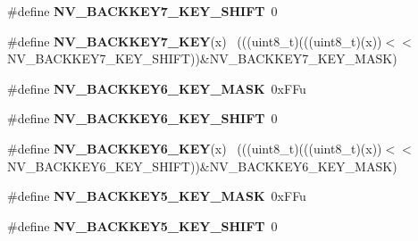 \begin{DoxyCompactItemize}
\item 
\hypertarget{group___n_v___register___masks_gad6bef74e61e792dfa5b7d195e4ce5620}{}\#define {\bfseries N\+V\+\_\+\+B\+A\+C\+K\+K\+E\+Y7\+\_\+\+K\+E\+Y\+\_\+\+S\+H\+I\+F\+T}~0\label{group___n_v___register___masks_gad6bef74e61e792dfa5b7d195e4ce5620}

\item 
\hypertarget{group___n_v___register___masks_gad81b2addd996d3f0ee299e252d88b0a9}{}\#define {\bfseries N\+V\+\_\+\+B\+A\+C\+K\+K\+E\+Y7\+\_\+\+K\+E\+Y}(x)                                          ~(((uint8\+\_\+t)(((uint8\+\_\+t)(x))$<$$<$N\+V\+\_\+\+B\+A\+C\+K\+K\+E\+Y7\+\_\+\+K\+E\+Y\+\_\+\+S\+H\+I\+F\+T))\&N\+V\+\_\+\+B\+A\+C\+K\+K\+E\+Y7\+\_\+\+K\+E\+Y\+\_\+\+M\+A\+S\+K)\label{group___n_v___register___masks_gad81b2addd996d3f0ee299e252d88b0a9}

\item 
\hypertarget{group___n_v___register___masks_ga44e2d846ef1b9d5ad94a707fa6f29ae1}{}\#define {\bfseries N\+V\+\_\+\+B\+A\+C\+K\+K\+E\+Y6\+\_\+\+K\+E\+Y\+\_\+\+M\+A\+S\+K}~0x\+F\+Fu\label{group___n_v___register___masks_ga44e2d846ef1b9d5ad94a707fa6f29ae1}

\item 
\hypertarget{group___n_v___register___masks_ga271a532af55987843f56d660efb5d440}{}\#define {\bfseries N\+V\+\_\+\+B\+A\+C\+K\+K\+E\+Y6\+\_\+\+K\+E\+Y\+\_\+\+S\+H\+I\+F\+T}~0\label{group___n_v___register___masks_ga271a532af55987843f56d660efb5d440}

\item 
\hypertarget{group___n_v___register___masks_gaf79c4e3cdf4165b1f5158054ec642039}{}\#define {\bfseries N\+V\+\_\+\+B\+A\+C\+K\+K\+E\+Y6\+\_\+\+K\+E\+Y}(x)                                          ~(((uint8\+\_\+t)(((uint8\+\_\+t)(x))$<$$<$N\+V\+\_\+\+B\+A\+C\+K\+K\+E\+Y6\+\_\+\+K\+E\+Y\+\_\+\+S\+H\+I\+F\+T))\&N\+V\+\_\+\+B\+A\+C\+K\+K\+E\+Y6\+\_\+\+K\+E\+Y\+\_\+\+M\+A\+S\+K)\label{group___n_v___register___masks_gaf79c4e3cdf4165b1f5158054ec642039}

\item 
\hypertarget{group___n_v___register___masks_gab1e58bd037f31bcaa1b96a71340315ba}{}\#define {\bfseries N\+V\+\_\+\+B\+A\+C\+K\+K\+E\+Y5\+\_\+\+K\+E\+Y\+\_\+\+M\+A\+S\+K}~0x\+F\+Fu\label{group___n_v___register___masks_gab1e58bd037f31bcaa1b96a71340315ba}

\item 
\hypertarget{group___n_v___register___masks_ga68762e18611e6dfaed3ddfd7847c09f4}{}\#define {\bfseries N\+V\+\_\+\+B\+A\+C\+K\+K\+E\+Y5\+\_\+\+K\+E\+Y\+\_\+\+S\+H\+I\+F\+T}~0\label{group___n_v___register___masks_ga68762e18611e6dfaed3ddfd7847c09f4}


\end{DoxyCompactItemize}
